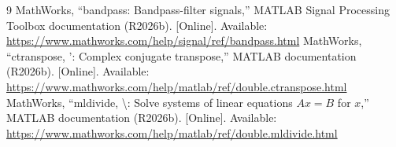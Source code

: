 \documentclass[11pt]{article}
\begin{document}
\begin{thebibliography}{9}
     MathWorks, ``bandpass: Bandpass-filter signals,'' MATLAB Signal Processing Toolbox documentation (R2026b). [Online]. Available: \url{https://www.mathworks.com/help/signal/ref/bandpass.html}
     MathWorks, ``ctranspose, ': Complex conjugate transpose,'' MATLAB documentation (R2026b). [Online]. Available: \url{https://www.mathworks.com/help/matlab/ref/double.ctranspose.html}
     MathWorks, ``mldivide, \textbackslash: Solve systems of linear equations $Ax = B$ for $x$,'' MATLAB documentation (R2026b). [Online]. Available: \url{https://www.mathworks.com/help/matlab/ref/double.mldivide.html}
\end{thebibliography}
\end{document}

